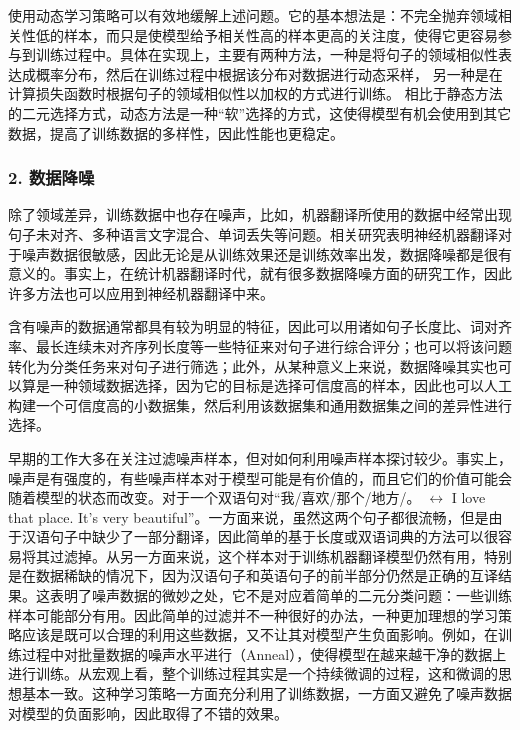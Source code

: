 \parinterval 使用动态学习策略可以有效地缓解上述问题。它的基本想法是：不完全抛弃领域相关性低的样本，而只是使模型给予相关性高的样本更高的关注度，使得它更容易参与到训练过程中。具体在实现上，主要有两种方法，一种是将句子的领域相似性表达成概率分布，然后在训练过程中根据该分布对数据进行动态采样， 另一种是在计算损失函数时根据句子的领域相似性以加权的方式进行训练。 相比于静态方法的二元选择方式，动态方法是一种“软”选择的方式，这使得模型有机会使用到其它数据，提高了训练数据的多样性，因此性能也更稳定。


\subsubsection{2. 数据降噪}

\parinterval 除了领域差异，训练数据中也存在噪声，比如，机器翻译所使用的数据中经常出现句子未对齐、多种语言文字混合、单词丢失等问题。相关研究表明神经机器翻译对于噪声数据很敏感，因此无论是从训练效果还是训练效率出发，数据降噪都是很有意义的。事实上，在统计机器翻译时代，就有很多数据降噪方面的研究工作，因此许多方法也可以应用到神经机器翻译中来。

\parinterval 含有噪声的数据通常都具有较为明显的特征，因此可以用诸如句子长度比、词对齐率、最长连续未对齐序列长度等一些特征来对句子进行综合评分；也可以将该问题转化为分类任务来对句子进行筛选；此外，从某种意义上来说，数据降噪其实也可以算是一种领域数据选择，因为它的目标是选择可信度高的样本，因此也可以人工构建一个可信度高的小数据集，然后利用该数据集和通用数据集之间的差异性进行选择。

\parinterval 早期的工作大多在关注过滤噪声样本，但对如何利用噪声样本探讨较少。事实上，噪声是有强度的，有些噪声样本对于模型可能是有价值的，而且它们的价值可能会随着模型的状态而改变。对于一个双语句对“我/喜欢/那个/地方/。 $\leftrightarrow$ I love that place. It's very beautiful”。一方面来说，虽然这两个句子都很流畅，但是由于汉语句子中缺少了一部分翻译，因此简单的基于长度或双语词典的方法可以很容易将其过滤掉。从另一方面来说，这个样本对于训练机器翻译模型仍然有用，特别是在数据稀缺的情况下，因为汉语句子和英语句子的前半部分仍然是正确的互译结果。这表明了噪声数据的微妙之处，它不是对应着简单的二元分类问题：一些训练样本可能部分有用。因此简单的过滤并不一种很好的办法，一种更加理想的学习策略应该是既可以合理的利用这些数据，又不让其对模型产生负面影响。例如，在训练过程中对批量数据的噪声水平进行{\small{}}（Anneal），使得模型在越来越干净的数据上进行训练。从宏观上看，整个训练过程其实是一个持续微调的过程，这和微调的思想基本一致。这种学习策略一方面充分利用了训练数据，一方面又避免了噪声数据对模型的负面影响，因此取得了不错的效果。

